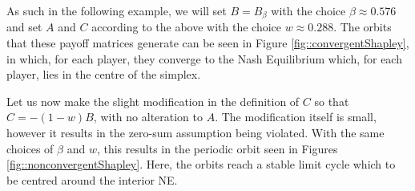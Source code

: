 \documentclass{article}
\theoremstyle{definition}
\begin{document}
  As such in the following example, we will set $B = B_\beta$ with the choice $\beta \approx 0.576$ and set $A$ and $C$ according to the above with the choice $w \approx 0.288$. The orbits that these payoff matrices generate can be seen in Figure \ref{fig::convergentShapley}, in which, for each player, they converge to the Nash Equilibrium which, for each player, lies in the centre of the simplex.

  Let us now make the slight modification in the definition of $C$ so that
%
    $C  = - (1 - w) B$, 
  with no alteration to $A$. The modification itself is small, however it results in the zero-sum
  assumption being violated. With the same choices of $\beta$ and $w$, this results in the periodic
  orbit seen in Figures \ref{fig::nonconvergentShapley}. Here,
  the orbits reach a stable limit cycle which to be centred around the interior NE.
\end{document}
